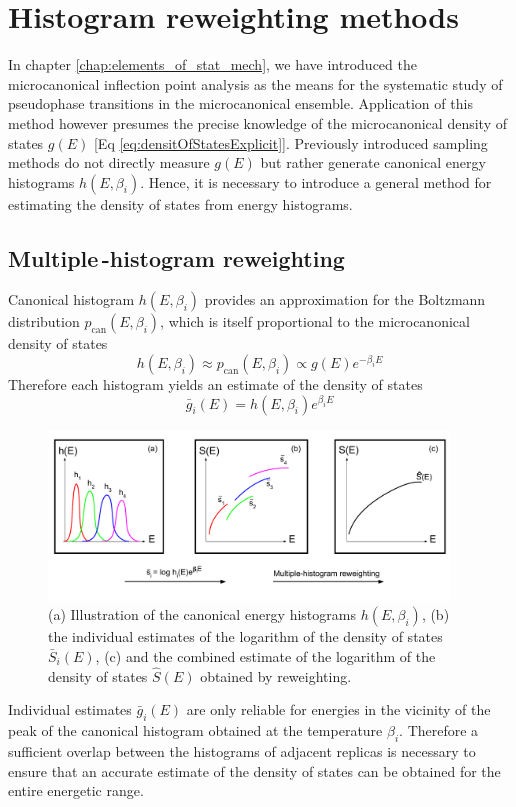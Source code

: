 \documentclass[12pt]{report}
\begin{document}
\section{Histogram reweighting methods}

In chapter \ref{chap:elements_of_stat_mech}, we have introduced the microcanonical inflection point analysis as the means for the systematic study of pseudophase transitions in the microcanonical ensemble. Application of this method however presumes the precise knowledge of the microcanonical density of states $g(E)$ [Eq \ref{eq:densitOfStatesExplicit}]. Previously introduced sampling methods do not directly measure $g(E)$ but rather generate canonical energy histograms $h(E,\beta_{i})$. Hence, it is necessary to introduce a general method for estimating the density of states from energy histograms.

\subsection{Multiple\,-histogram reweighting}
Canonical histogram $h(E,\beta_{i})$ provides an approximation for the Boltzmann distribution $p_{\mathrm{can}}(E, \beta_{i})$, which is itself proportional to the microcanonical density of states
%
\begin{equation}
\label{eq:canonicalDistribution}
h(E,\beta_{i}) \approx p_{\mathrm{can}}(E, \beta_{i}) \propto g(E)e^{-\beta_{i}E}
\end{equation}
%
Therefore each histogram yields an estimate of the density of states 
%
\begin{equation}
\label{eq:singleHistogramReweighting}
\bar{g}_{i}(E) = h(E,\beta_{i})e^{\beta _{i} E}
\end{equation}
%
%
\begin{figure}
\center
\includegraphics[width = 0.95\textwidth]{chapter3Figs/multipleHistogramReweighting.pdf}
\caption{\label{fig:MHR}%
(a) Illustration of the canonical energy histograms $h(E,\beta_{i})$, (b) the individual estimates of the logarithm of the density of states $\bar{S}_{i}(E)$, (c) and the combined estimate of the logarithm of the density of states $\hat{S}(E)$ obtained by reweighting.}
\end{figure}
% 
Individual estimates $\bar{g}_{i}(E)$ are only reliable for energies in the
vicinity of the peak of the canonical histogram obtained at the temperature
$\beta _{i}$. Therefore a sufficient overlap between the histograms of
adjacent replicas is necessary to ensure that an accurate estimate of the density of states can be obtained for the entire energetic range. 
\end{document}
